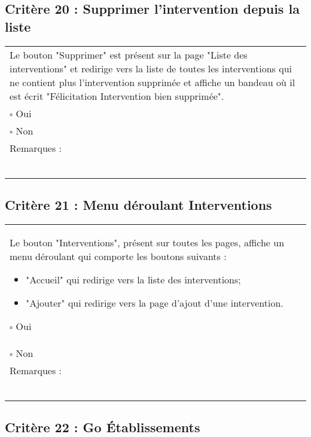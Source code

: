   		
  		
  			\subsection*{Critère 20 : Supprimer l'intervention depuis la liste}
	
	\begin{center}
    	 		\begin{tabular}[h]{|p{}|}
			\hline
				Le bouton "Supprimer" est présent sur la page "Liste des interventions" et redirige vers la liste de toutes les interventions qui ne contient plus l'intervention supprimée et affiche un bandeau où il est écrit "Félicitation Intervention bien supprimée".\\
				$\square$ Oui  \\ $\square$ Non \\\hline Remarques : \\ ~\\
			 \\\hline
     		\end{tabular}
  		\end{center}

  		
  			\subsection*{Critère 21 : Menu déroulant Interventions}
	
	\begin{center}
    	 		\begin{tabular}[h]{|p{}|}
			\hline
				Le bouton "Interventions", présent sur toutes les pages, affiche un menu déroulant qui comporte les boutons suivants : 
				\begin{itemize}
					\item "Accueil" qui redirige vers la liste des interventions;
					\item "Ajouter" qui redirige vers la page d'ajout d'une intervention.
				\end{itemize}
				$\square$ Oui  \\ $\square$ Non \\\hline Remarques : \\ ~\\
			 \\\hline
     		\end{tabular}
  		\end{center}
  		
  		
  		  	\subsection*{Critère 22 : Go Établissements}
	
